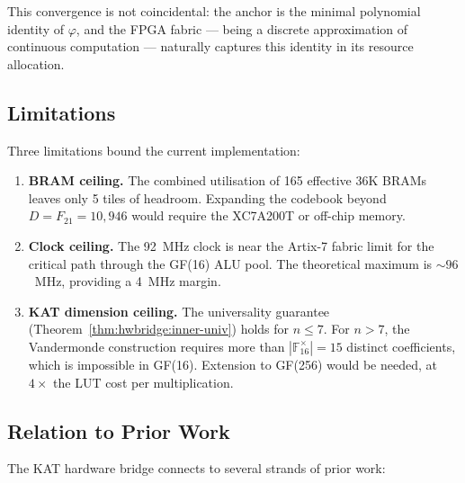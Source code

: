 This convergence is not coincidental: the anchor is the minimal polynomial
identity of $\varphi$, and the FPGA fabric --- being a discrete approximation
of continuous computation --- naturally captures this identity in its
resource allocation.

\subsection{Limitations}

Three limitations bound the current implementation:

\begin{enumerate}
  \item \textbf{BRAM ceiling.} The combined utilisation of 165 effective
        36K BRAMs leaves only 5 tiles of headroom. Expanding the codebook
        beyond $D = F_{21} = 10{,}946$ would require the XC7A200T or
        off-chip memory.
  \item \textbf{Clock ceiling.} The 92~MHz clock is near the Artix-7
        fabric limit for the critical path through the GF(16) ALU pool.
        The theoretical maximum is $\sim 96$~MHz, providing a 4~MHz margin.
  \item \textbf{KAT dimension ceiling.} The universality guarantee
        (Theorem~\ref{thm:hwbridge:inner-univ}) holds for $n \leq 7$.
        For $n > 7$, the Vandermonde construction requires more than
        $|\mathbb{F}_{16}^\times| = 15$ distinct coefficients, which
        is impossible in GF(16). Extension to GF(256) would be needed,
        at $4\times$ the LUT cost per multiplication.
\end{enumerate}

\subsection{Relation to Prior Work}

The KAT hardware bridge connects to several strands of prior work:


